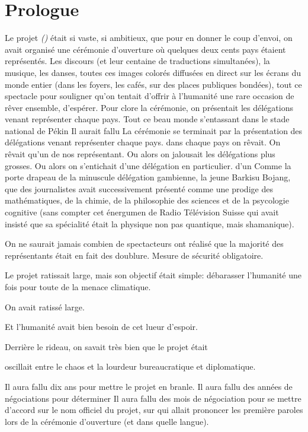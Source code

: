 \chapter*{Prologue}

Le projet \textit{\nomProjet{} (\nomProjetEn{})} était si vaste, si ambitieux,
que pour en donner le coup d'envoi, on avait organisé une cérémonie d'ouverture
où quelques deux cents pays étaient représentés.  
%
Les discours (et leur centaine de traductions simultanées), la
musique, les danses, toutes ces images colorés diffusées en direct sur les
écrans du monde entier (dans les foyers, les cafés, sur des places publiques
bondées), tout ce spectacle pour souligner qu'on tentait d'offrir à l'humanité
une rare occasion de rêver ensemble, d'espérer.
%
Pour clore la cérémonie, on présentait les délégations venant représenter
chaque pays.
Tout ce beau monde s'entassant dans le stade national de Pékin
Il aurait fallu
La cérémonie se terminait par la présentation des délégations venant
représenter chaque pays.
dans chaque pays on rêvait. On rêvait qu'un de nos représentant.  Ou alors on
jalousait les délégations plus grosses.  Ou alors on s'entichait d'une
délégation en particulier.  d'un Comme la porte drapeau de la minuscule
délégation gambienne, la jeune Barkisu Bojang, que des journalistes avait
successivement présenté comme une prodige des mathématiques, de la chimie, de
la philosophie des sciences et de la psycologie cognitive (sans compter cet
énergumen de Radio Télévision Suisse qui avait insisté que sa spécialité était
la physique non pas quantique, mais shamanique).

On ne saurait jamais combien de spectacteurs ont réalisé que la majorité des représentants 
était en fait des doublure. Mesure de sécurité obligatoire.


Le projet \nomProjet{} ratissait large, mais son objectif était simple:
débarasser l'humanité une fois pour toute de la menace climatique. 



On avait ratissé large.


Et l'humanité avait bien besoin de cet lueur d'espoir.

Derrière le rideau, on savait très bien que le projet \nomProjet{} était 

oscillait entre le chaos et la lourdeur bureaucratique et diplomatique.

Il aura fallu dix ans pour mettre le projet en branle.
Il aura fallu des années de négociations pour déterminer
Il aura fallu des mois de négociation pour se mettre d'accord sur le nom officiel du projet, sur qui allait prononcer les première paroles
lors de la cérémonie d'ouverture (et dans quelle langue).

